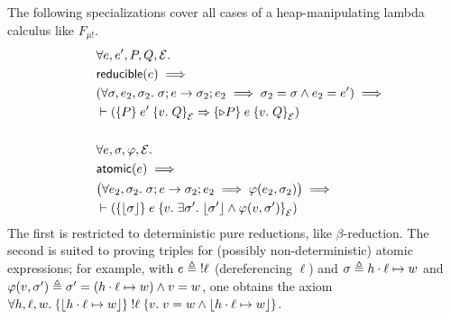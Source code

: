 The following specializations cover all cases of a heap-manipulating lambda calculus like $F_{\mu!}$.
\begin{align*}
 &\All \expr, \expr', \prop, \propB, \mask. \\
 &\textlog{reducible}(e) \implies \\
 &(\All \state, \expr_2, \state_2. \cfg{\state}{\expr} \step \cfg{\state_2}{\expr_2} \implies \state_2 = \state \land \expr_2 = \expr') \implies \\
 &{} \proves (\hoare{\prop}{\expr'}{\Ret\val. \propB}[\mask] \Ra \hoare{\later\prop}{\expr}{\Ret\val. \propB}[\mask] ) \\
 \quad \\
 &\All \expr, \state, \pred, \mask. \\
 &\textlog{atomic}(e) \implies \\
 &\bigl(\All \expr_2, \state_2. \cfg{\state}{\expr} \step \cfg{\state_2}{\expr_2} \implies \pred(\expr_2, \state_2)\bigr) \implies \\
 &{} \proves (\hoare{ \ownPhys{\state} }{\expr}{\Ret\val. \Exists\state'. \ownPhys{\state'} \land \pred(\val, \state') }[\mask] )
\end{align*}
The first is restricted to deterministic pure reductions, like $\beta$-reduction.
The second is suited to proving triples for (possibly non-deterministic) atomic expressions; for example, with $e \triangleq \;!\ell$ (dereferencing $\ell$) and $\sigma \triangleq h \mathbin{\cdot} \ell \mapsto w$ and $\varphi(v, \sigma') \triangleq \sigma' = (h \mathbin{\cdot} \ell \mapsto w) \land v = w$, one obtains the axiom $\All h, \ell, \valB. \hoare{\ownPhys{h \mtimes \ell \mapsto \valB}}{!\ell}{\Ret\val. \val = \valB \land \ownPhys{h \mtimes \ell \mapsto \valB} }$.

